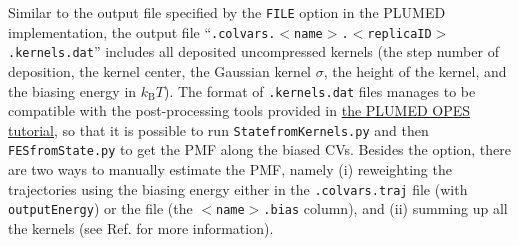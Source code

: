 Similar to the output file specified by the \texttt{FILE} option in the PLUMED implementation, the output file ``\outputName\texttt{.colvars.$<$name$>$.$<$replicaID$>$.kernels.dat}'' includes all deposited uncompressed kernels (the step number of deposition, the kernel center, the Gaussian kernel $\sigma$, the height of the kernel, and the biasing energy in $k_{\mathrm{B}} T$). The format of \texttt{.kernels.dat} files manages to be compatible with the post-processing tools provided in \href{https://www.plumed.org/doc-v2.7/user-doc/html/opes-metad.html}{the PLUMED OPES tutorial}, so that it is possible to run \texttt{State{\textunderscore}from{\textunderscore}Kernels.py} and then \texttt{FES{\textunderscore}from{\textunderscore}State.py} to get the PMF along the biased CVs. Besides the  option, there are two ways to manually estimate the PMF, namely (i) reweighting the trajectories using the biasing energy either in the \texttt{.colvars.traj} file (with \texttt{outputEnergy}) or the  file (the \texttt{$<$name$>$.bias} column), and (ii) summing up all the kernels (see Ref.\cite{Invernizzi2020} for more information).


